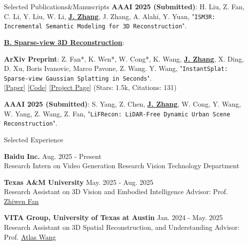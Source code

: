 \documentclass{resume} %
\begin{document}
\begin{rSection}{Selected Publications\&Manuscripts}
{ {\bf AAAI 2025 (Submitted)}}:
H. Liu, Z. Fan, C. Li, Y. Liu, W. Li, \underline{\textbf{J. Zhang}}, J. Zhang, A. Alahi, Y. Yuan,
 "{\texttt{ISM3R: Incremental Semantic Modeling for 3D Reconstruction}}".
\vspace{-1mm}

\textbf{\underline{B. Sparse-view 3D Reconstruction}}:

{ {\bf ArXiv Preprint}}:
Z. Fan*, K. Wen*, W. Cong*, K. Wang, \underline{\textbf{J. Zhang}}, X. Ding, 
D. Xu, Boris Ivanovic, Marco Pavone, Z. Wang. Y. Wang,
 "{\texttt{InstantSplat: Sparse-view Gaussian Splatting in Seconds}}".
\\ \hspace{1em} {\color{BlueViolet} \href{https://arxiv.org/abs/2403.20309}{[\underline{Paper}]} \hspace{1em} \href{https://github.com/NVlabs/InstantSplat}{[\underline{Code}]} \hspace{1em} \href{https://instantsplat.github.io/}{[\underline{Project Page}]}} \hspace{1em} (Stars: 1.5k, Citations: 131)
\vspace{-1mm}

{ {\bf AAAI 2025 (Submitted)}}:
S. Yang, Z. Chen, \underline{\textbf{J. Zhang}}, W. Cong, Y. Wang, W. Yang, Z. Wang, Z. Fan,
 "{\texttt{LiFRecon: LiDAR-Free Dynamic Urban Scene Reconstruction}}".
\vspace{-1mm}
 
\vspace{-1mm}
\end{rSection}

\begin{rSection}{Selected Experience}

\vspace{-0mm}
{ {\bf Baidu Inc.}} \hfill  Aug. 2025 - Present
\\Research Intern on Video Generation Research \hfill Vision Technology Department

\vspace{-0.5mm}

{ {\bf Texas A\&M University}} \hfill  May. 2025 - Aug. 2025
\\Research Assistant on 3D Vision and Embodied Intelligence \hfill Advisor: Prof. {\color{BlueViolet} \href{https://zhiwenfan.github.io/}{Zhiwen Fan}}

\vspace{-0.5mm}

{ {\bf VITA Group, University of Texas at Austin}} \hfill  Jan. 2024 - May. 2025
\\Research Assistant on 3D Spatial Reconstruction, and Understanding \hfill Advisor: Prof. {\color{BlueViolet} \href{https://vita-group.github.io/group.html}{Atlas Wang}}

\end{rSection}
\end{document}
